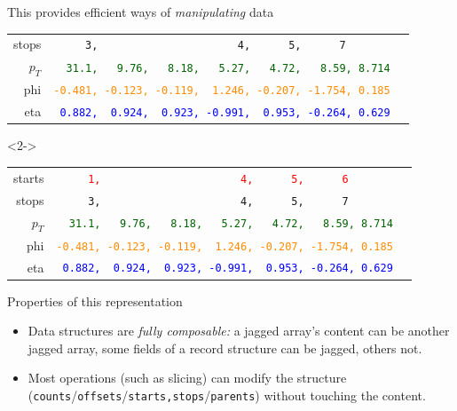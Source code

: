 \documentclass[aspectratio=169]{beamer}
\begin{document}
\begin{frame}[fragile]{This provides efficient ways of {\it manipulating} data}
\begin{onlyenv}
\begin{tabular}{r l}
\small stops   &                    {\tt\scriptsize \ \ \ \ \ 3,\ \ \ \ \ \ \ \ \ \ \ \ \ \ \ \ \ \ \ \ \ \ 4,\ \ \ \ \ \ 5,\ \ \ \ \ \ 7\ \ \ \ \ \ \ \ \ } \\
\small $p_T$ & \textcolor{darkgreen}{\tt\scriptsize \ \ 31.1,\ \ \ 9.76,\ \ \ 8.18,\ \ \ 5.27,\ \ \ 4.72,\ \ \ 8.59, 8.714} \\
\small phi &  \textcolor{darkorange}{\tt\scriptsize -0.481,\ -0.123,\ -0.119,\ \ 1.246,\ -0.207,\ -1.754,\ 0.185} \\
\small eta &        \textcolor{blue}{\tt\scriptsize \ 0.882,\ \ 0.924,\ \ 0.923,\ -0.991,\ \ 0.953,\ -0.264,\ 0.629} \\
\end{tabular}
\end{onlyenv}\begin{onlyenv}<2->
\begin{tabular}{r l}
\small starts  &     \textcolor{red}{\tt\scriptsize \ \ \ \ \ 1,\ \ \ \ \ \ \ \ \ \ \ \ \ \ \ \ \ \ \ \ \ \ 4,\ \ \ \ \ \ 5,\ \ \ \ \ \ 6\ \ \ \ \ \ \ \ \ } \\
\small stops   &                    {\tt\scriptsize \ \ \ \ \ 3,\ \ \ \ \ \ \ \ \ \ \ \ \ \ \ \ \ \ \ \ \ \ 4,\ \ \ \ \ \ 5,\ \ \ \ \ \ 7\ \ \ \ \ \ \ \ \ } \\
\small $p_T$ & \textcolor{darkgreen}{\tt\scriptsize \ \ 31.1,\ \ \ 9.76,\ \ \ 8.18,\ \ \ 5.27,\ \ \ 4.72,\ \ \ 8.59, 8.714} \\
\small phi &  \textcolor{darkorange}{\tt\scriptsize -0.481,\ -0.123,\ -0.119,\ \ 1.246,\ -0.207,\ -1.754,\ 0.185} \\
\small eta &        \textcolor{blue}{\tt\scriptsize \ 0.882,\ \ 0.924,\ \ 0.923,\ -0.991,\ \ 0.953,\ -0.264,\ 0.629} \\
\end{tabular}\end{onlyenv}
\vspace{0.5 cm}

\end{frame}

\begin{frame}{Properties of this representation}
\Large
\vspace{0.5 cm}
\begin{itemize}\setlength{\itemsep}{0.5 cm}
\item<1-> Data structures are {\it fully composable:} a jagged array's content can be another jagged array, some fields of a record structure can be jagged, others not.
\item<2-> Most operations (such as slicing) can modify the structure ({\tt counts}/{\tt offsets}/{\tt starts,stops}/{\tt parents}) without touching the content.
\end{itemize}
\end{frame}
\end{document}
